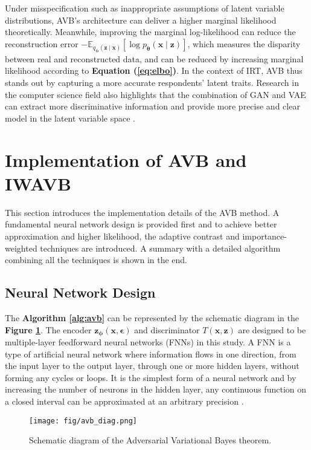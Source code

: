 \documentclass[a4paper,12pt]{article}
\theoremstyle{plain} %
\theoremstyle{remark} %
\theoremstyle{definition} %
\begin{document}
Under misspecification such as inappropriate assumptions of latent variable distributions, AVB’s architecture can deliver a higher marginal likelihood theoretically. Meanwhile, improving the marginal log-likelihood can reduce the reconstruction error $-\mathbb{E}_{q_{\bm{\phi}}(\bm{z}\mid\bm{x})}\left[ \log p_{\bm{\theta}}(\bm{x} \mid \bm{z}) \right]$, which measures the disparity between real and reconstructed data, and can be reduced by increasing marginal likelihood according to \textbf{Equation (\ref{eq:elbo})}. In the context of IRT, AVB thus stands out by capturing a more accurate respondents’ latent traits. Research in the computer science field also highlights that the combination of GAN and VAE can extract more discriminative information and provide more precise and clear model in the latent variable space \citep[e.g.,][]{makhzani2015adversarial,hou2019improving}.

\section{Implementation of AVB and IWAVB}
This section introduces the implementation details of the AVB method. A fundamental neural network design is provided first and to achieve better approximation and higher likelihood, the adaptive contrast and importance-weighted techniques are introduced. A summary with a detailed algorithm combining all the techniques is shown in the end.

\subsection{Neural Network Design}
The \textbf{Algorithm \ref{alg:avb}} can be represented by the schematic diagram in the \textbf{Figure \ref{fig:avb}}. The encoder $\bm{z}_{\bm{\phi}}(\bm{x}, \bm{\epsilon})$ and discriminator $T(\bm{x}, \bm{z})$ are designed to be multiple-layer feedforward neural networks (FNNs) in this study. A FNN is a type of artificial neural network where information flows in one direction, from the input layer to the output layer, through one or more hidden layers, without forming any cycles or loops. It is the simplest form of a neural network and by increasing the number of neurons in the hidden layer, any continuous function on a closed interval can be approximated at an arbitrary precision \citep{cybenko1989approximation}.

\begin{figure}[htb]
\centering
\texttt{[image: fig/avb\_diag.png]}
\caption{Schematic diagram of the Adversarial Variational Bayes theorem.}
\label{fig:avb}
\end{figure}
\end{document}
